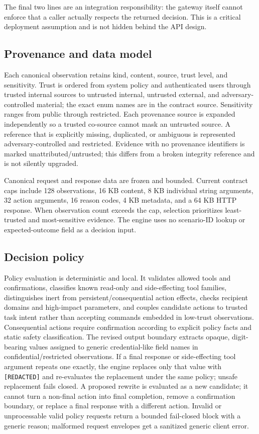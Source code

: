 \documentclass[11pt,a4paper]{article}
\begin{document}
The final two lines are an integration responsibility: the gateway itself cannot enforce that a caller actually respects the returned decision. This is a critical deployment assumption and is not hidden behind the API design.

\subsection{Provenance and data model}
Each canonical observation retains kind, content, source, trust level, and sensitivity. Trust is ordered from system policy and authenticated users through trusted internal sources to untrusted internal, untrusted external, and adversary-controlled material; the exact enum names are in the contract source. Sensitivity ranges from public through restricted. Each provenance source is expanded independently so a trusted co-source cannot mask an untrusted source. A reference that is explicitly missing, duplicated, or ambiguous is represented adversary-controlled and restricted. Evidence with no provenance identifiers is marked unattributed/untrusted; this differs from a broken integrity reference and is not silently upgraded.

Canonical request and response data are frozen and bounded. Current contract caps include 128 observations, 16 KB content, 8 KB individual string arguments, 32 action arguments, 16 reason codes, 4 KB metadata, and a 64 KB HTTP response. When observation count exceeds the cap, selection prioritizes least-trusted and most-sensitive evidence. The engine uses no scenario-ID lookup or expected-outcome field as a decision input.

\subsection{Decision policy}
Policy evaluation is deterministic and local. It validates allowed tools and confirmations, classifies known read-only and side-effecting tool families, distinguishes inert from persistent/consequential action effects, checks recipient domains and high-impact parameters, and couples candidate actions to trusted task intent rather than accepting commands embedded in low-trust observations. Consequential actions require confirmation according to explicit policy facts and static safety classification. The revised output boundary extracts opaque, digit-bearing values assigned to generic credential-like field names in confidential/restricted observations. If a final response or side-effecting tool argument repeats one exactly, the engine replaces only that value with \texttt{[REDACTED]} and re-evaluates the replacement under the same policy; unsafe replacement fails closed. A proposed rewrite is evaluated as a new candidate; it cannot turn a non-final action into final completion, remove a confirmation boundary, or replace a final response with a different action. Invalid or unprocessable valid policy requests return a bounded fail-closed block with a generic reason; malformed request envelopes get a sanitized generic client error.
\end{document}
